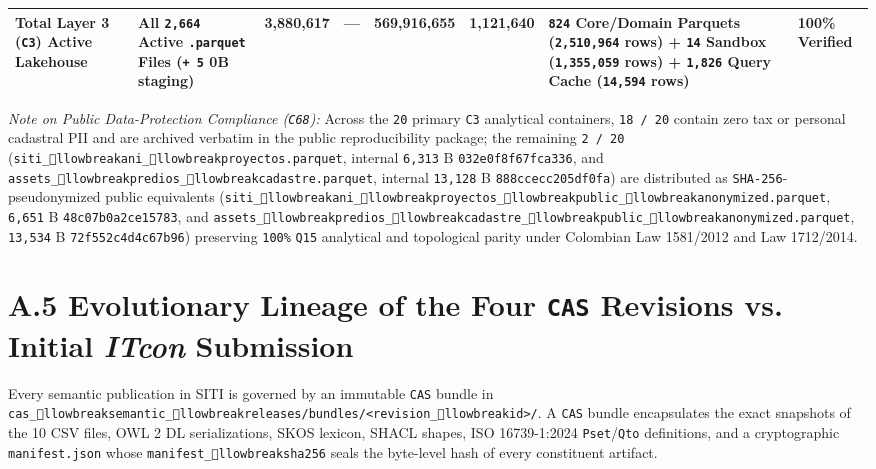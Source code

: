 \documentclass[10pt,a4paper]{article}
\begin{document}
{\begin{longtable}{p{}p{}p{}p{}p{}p{}p{}p{}}
\textbf{Total Layer 3 (\texttt{C3}) Active Lakehouse} & \textbf{All \texttt{2,664} Active \texttt{.parquet} Files (\texttt{+ 5} 0B staging)} & \textbf{3,880,617} & --- & \textbf{569,916,655} & \textbf{1,121,640} & \textbf{\texttt{824} Core/Domain Parquets (\texttt{2,510,964} rows) + \texttt{14} Sandbox (\texttt{1,355,059} rows) + \texttt{1,826} Query Cache (\texttt{14,594} rows)} & \textbf{100\% Verified} \\
\bottomrule
\end{longtable}
}

\textit{Note on Public Data-Protection Compliance (\texttt{C68}):} Across the \texttt{20} primary \texttt{C3} analytical containers, \texttt{18 / 20} contain zero tax or personal cadastral PII and are archived verbatim in the public reproducibility package; the remaining \texttt{2 / 20} (\texttt{siti\_llowbreak{}ani\_llowbreak{}proyectos.parquet}, internal \texttt{6,313} B \texttt{032e0f8f67fca336}, and \texttt{assets\_llowbreak{}predios\_llowbreak{}cadastre.parquet}, internal \texttt{13,128} B \texttt{888ccecc205df0fa}) are distributed as \texttt{SHA-256}-pseudonymized public equivalents (\texttt{siti\_llowbreak{}ani\_llowbreak{}proyectos\_llowbreak{}public\_llowbreak{}anonymized.parquet}, \texttt{6,651} B \texttt{48c07b0a2ce15783}, and \texttt{assets\_llowbreak{}predios\_llowbreak{}cadastre\_llowbreak{}public\_llowbreak{}anonymized.parquet}, \texttt{13,534} B \texttt{72f552c4d4c67b96}) preserving \texttt{100\%} \texttt{Q15} analytical and topological parity under Colombian Law 1581/2012 and Law 1712/2014.



\section*{A.5 Evolutionary Lineage of the Four \texttt{CAS} Revisions vs. Initial \textit{ITcon} Submission}

Every semantic publication in SITI is governed by an immutable \texttt{CAS} bundle in \texttt{cas\_llowbreak{}semantic\_llowbreak{}releases/bundles/<revision\_llowbreak{}id>/}. A \texttt{CAS} bundle encapsulates the exact snapshots of the 10 CSV files, OWL 2 DL serializations, SKOS lexicon, SHACL shapes, ISO 16739-1:2024 \texttt{Pset}/\texttt{Qto} definitions, and a cryptographic \texttt{manifest.json} whose \texttt{manifest\_llowbreak{}sha256} seals the byte-level hash of every constituent artifact.
\end{document}
